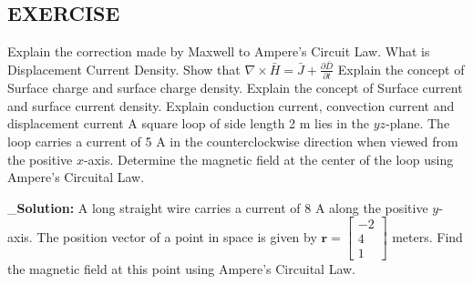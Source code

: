 \begin{mdframed}[backgroundcolor=lightblue, linewidth=1pt, hidealllines=true]
\section{EXERCISE}

\begin{ExerciseList}
	 \Exercise[label={ex11}]Explain the correction made by Maxwell to 		Ampere's Circuit Law.
	\Exercise[label={ex12}] What is Displacement Current Density.
	\Exercise[label={ex13}] Show that $\nabla\times\bar{H}=\bar{J}+\frac{\partial\bar{D}}{\partial t}$
	\Exercise[label={ex14}] Explain the concept of Surface charge and surface charge density.
	\Exercise[label={ex15}] Explain the concept of Surface current and surface current density.
	\Exercise[label={ex16}] Explain conduction current, convection current and displacement current
	\Exercise[label={ex17}] A square loop of side length 2 m lies in the $yz$-plane. The loop carries a current of 5 A in the counterclockwise direction when viewed from the positive $x$-axis. Determine the magnetic field at the center of the loop using Ampere's Circuital Law.
	
	_{}\textbf{Solution:}
%	
%	
%	
	\Exercise[label={ex17}] A long straight wire carries a current of 8 A along the positive $y$-axis. The position vector of a point in space is given by $\mathbf{r} = \begin{bmatrix} -2 \\ 4 \\ 1 \end{bmatrix}$ meters. Find the magnetic field at this point using Ampere's Circuital Law.
	

\end{ExerciseList}
\end{mdframed}
